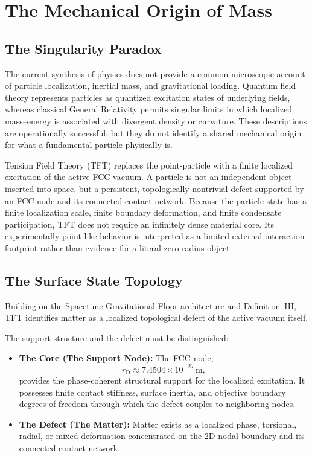 \chapter{The Mechanical Origin of Mass}

\section{The Singularity Paradox}

The current synthesis of physics does not provide a common microscopic account of particle localization, inertial mass, and gravitational loading. Quantum field theory represents particles as quantized excitation states of underlying fields, whereas classical General Relativity permits singular limits in which localized mass--energy is associated with divergent density or curvature. These descriptions are operationally successful, but they do not identify a shared mechanical origin for what a fundamental particle physically is.

Tension Field Theory (TFT) replaces the point-particle with a finite localized excitation of the active FCC vacuum. A particle is not an independent object inserted into space, but a persistent, topologically nontrivial defect supported by an FCC node and its connected contact network. Because the particle state has a finite localization scale, finite boundary deformation, and finite condensate participation, TFT does not require an infinitely dense material core. Its experimentally point-like behavior is interpreted as a limited external interaction footprint rather than evidence for a literal zero-radius object.

\section{The Surface State Topology}

Building on the Spacetime Gravitational Floor architecture and \hyperref[def:definition_three]{Definition~III}, TFT identifies matter as a localized topological defect of the active vacuum itself. 

The support structure and the defect must be distinguished:
\begin{itemize}
    \item \textbf{The Core (The Support Node):} The FCC node,
    \begin{equation}
        r_{\mathrm{D}} \approx 7.4504\times10^{-27}\,\mathrm{m},
    \end{equation}
    provides the phase-coherent structural support for the localized excitation. It possesses finite contact stiffness, surface inertia, and objective boundary degrees of freedom through which the defect couples to neighboring nodes.
    
    \item \textbf{The Defect (The Matter):} Matter exists as a localized phase, torsional, radial, or mixed deformation concentrated on the 2D nodal boundary and its connected contact network.
\end{itemize}

